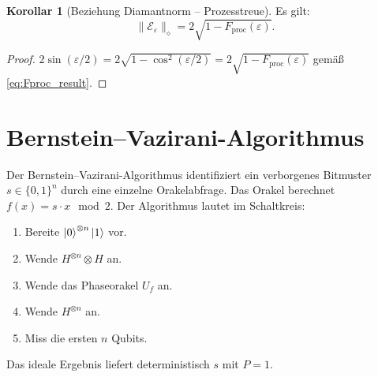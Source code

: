 ﻿\documentclass[11pt,a4paper]{article}
\theoremstyle{definition}
\newtheorem{corollary}[theorem]{Korollar}
\newcommand{\eps}{\varepsilon}
\begin{document}
\begin{corollary}[Beziehung Diamantnorm -- Prozesstreue]
  Es gilt:
  \begin{equation}
    \|\mathcal{E}_\eps\|_\diamond = 2\sqrt{1 - F_{\!\mathrm{proc}}(\eps)}.
    \label{eq:diamond_fproc}
  \end{equation}
\end{corollary}

\begin{proof}
  $2\sin(\eps/2) = 2\sqrt{1-\cos^2(\eps/2)} = 2\sqrt{1-F_{\mathrm{proc}}(\eps)}$
  gemäß \eqref{eq:Fproc_result}.
\end{proof}

\section{Bernstein--Vazirani-Algorithmus}
\label{sec:bv}

Der Bernstein--Vazirani-Algorithmus \cite{BV1993} identifiziert ein verborgenes
Bitmuster $s\in\{0,1\}^n$ durch eine einzelne Orakelabfrage.
Das Orakel berechnet $f(x) = s\cdot x \mod 2$.
Der Algorithmus lautet im Schaltkreis:
\begin{enumerate}
  \item Bereite $\ket{0}^{\otimes n}\ket{1}$ vor.
  \item Wende $H^{\otimes n}\otimes H$ an.
  \item Wende das Phaseorakel $U_f$ an.
  \item Wende $H^{\otimes n}$ an.
  \item Miss die ersten $n$ Qubits.
\end{enumerate}
Das ideale Ergebnis liefert deterministisch $s$ mit $P = 1$.
\end{document}
